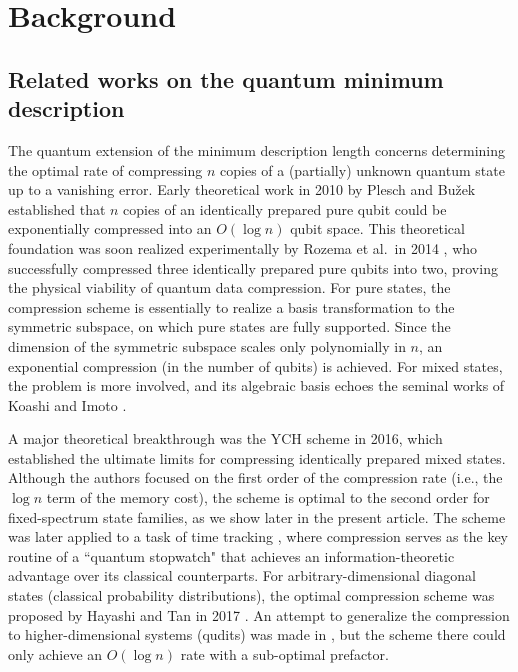 \documentclass[a4paper,onecolumn,11pt]{quantumarticle}
\begin{document}
\section{Background}\label{sec:background}
{\color{blue}
\subsection{Related works on the quantum minimum description}\label{sec:related_works}
The quantum extension of the minimum description length \cite{rissanen1978modeling} concerns determining the optimal rate of compressing $n$ copies of a (partially) unknown quantum state up to a vanishing error.
Early theoretical work in 2010 by Plesch and Bu\v{z}ek \cite{plesch2010efficient} established that $n$ copies of an identically prepared pure qubit could be exponentially compressed into an $O(\log n)$ qubit space. This theoretical foundation was soon realized experimentally by Rozema et al.~in 2014 \cite{rozema2014quantum}, who successfully compressed three identically prepared pure qubits into two, proving the physical viability of quantum data compression.
For pure states, the compression scheme is essentially to realize a basis transformation to the symmetric subspace, on which pure states are fully supported. Since the dimension of the symmetric subspace scales only polynomially in $n$, an exponential compression (in the number of qubits) is achieved. For mixed states, the problem is more involved, and its algebraic basis echoes the seminal works of Koashi and Imoto \cite{koashi2001compressibility,koashi2001possible}.

A major theoretical breakthrough was the YCH scheme \cite{yang2016optimal} in 2016, which established the ultimate limits for compressing identically prepared mixed states. Although the authors focused on the first order of the compression rate (i.e., the $\log n$ term of the memory cost), the scheme is optimal to the second order for fixed-spectrum state families, as we show later in the present article.
The scheme was later applied to a task of time tracking \cite{yang2018quantum,yang2018compressionfor}, where compression serves as the key routine of a ``quantum stopwatch" that achieves an information-theoretic advantage over its classical counterparts.
For arbitrary-dimensional diagonal states (classical probability distributions), the optimal compression scheme was proposed by Hayashi and Tan in 2017 \cite{hayashi2017minimum}.
An attempt to generalize the compression to higher-dimensional systems (qudits) was made in \cite{yang2016efficient}, but the scheme there could only achieve an $O(\log n)$ rate with a sub-optimal prefactor. 

}
\end{document}
